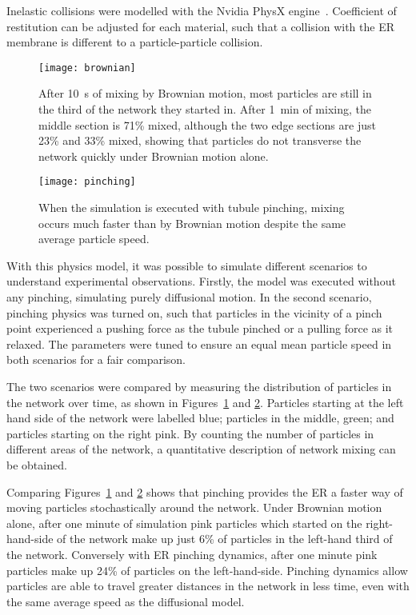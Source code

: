 Inelastic collisions were modelled with the Nvidia PhysX engine~\cite{nvidia2008physx}.
Coefficient of restitution can be adjusted for each material, such that a collision with the ER membrane is different to a particle-particle collision.

\begin{figure}[t!]
	\centering
	\texttt{[image: brownian]}
	\caption[ER simulation: After one minute of mixing by Brownian motion the simulated ER mixture is not homogeneous]{After \SI{10}{\second} of mixing by Brownian motion, most particles are still in the third of the network they started in. After \SI{1}{\minute} of mixing, the middle section is 71\% mixed, although the two edge sections are just 23\% and 33\% mixed, showing that particles do not transverse the network quickly under Brownian motion alone. }
	\label{fig:ER-simulation-brownian}
\end{figure}

\begin{figure}[t!]
	\centering
	\texttt{[image: pinching]}
	\caption[ER simulation: A homogeneous mixture is achieved after one minute in the ER simulation with pinching]{When the simulation is executed with tubule pinching, mixing occurs much faster than by Brownian motion despite the same average particle speed.}
	\label{fig:ER-simulation-pinching}
\end{figure}

With this physics model, it was possible to simulate different scenarios to understand experimental observations.
Firstly, the model was executed without any pinching, simulating purely diffusional motion.
In the second scenario, pinching physics was turned on, such that particles in the vicinity of a pinch point experienced a pushing force as the tubule pinched or a pulling force as it relaxed.
The parameters were tuned to ensure an equal mean particle speed in both scenarios for a fair comparison.

The two scenarios were compared by measuring the distribution of particles in the network over time, as shown in Figures~\ref{fig:ER-simulation-brownian} and \ref{fig:ER-simulation-pinching}.
Particles starting at the left hand side of the network were labelled blue; particles in the middle, green; and particles starting on the right pink.
By counting the number of particles in different areas of the network, a quantitative description of network mixing can be obtained.

Comparing Figures~\ref{fig:ER-simulation-brownian} and \ref{fig:ER-simulation-pinching} shows that pinching provides the ER a faster way of moving particles stochastically around the network.
Under Brownian motion alone, after one minute of simulation pink particles which started on the right-hand-side of the network make up just 6\% of particles in the left-hand third of the network.
Conversely with ER pinching dynamics, after one minute pink particles make up 24\% of particles on the left-hand-side.
Pinching dynamics allow particles are able to travel greater distances in the network in less time, even with the same average speed as the diffusional model.

